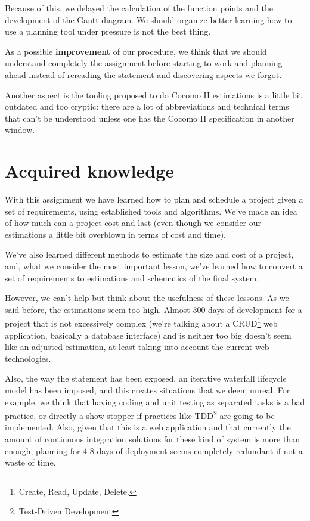 \documentclass{article}
\begin{document}
Because of this, we delayed the calculation of the function points and the development of the Gantt diagram. We should organize better learning how to use a planning tool under pressure is not the best thing.

As a possible \textbf{improvement} of our procedure, we think that we should understand completely the assignment before starting to work and planning ahead instead of rereading the statement and discovering aspects we forgot.

Another aspect is the tooling proposed to do Cocomo II estimations is a little bit outdated and too cryptic: there are a lot of abbreviations and technical terms that can't be understood unless one has the Cocomo II specification in another window.

\section{Acquired knowledge}

With this assignment we have learned how to plan and schedule a project given a set of requirements, using established tools and algorithms. We've made an idea of how much can a project cost and last (even though we consider our estimations a little bit overblown in terms of cost and time).

We've also learned different methods to estimate the size and cost of a project, and, what we consider the most important lesson, we've learned how to convert a set of requirements to estimations and schematics of the final system.

However, we can't help but think about the usefulness of these lessons. As we said before, the estimations seem too high. Almost 300 days of development for a project that is not excessively complex (we're talking about a CRUD\footnote{Create, Read, Update, Delete.} web application, basically a database interface) and is neither too big doesn't seem like an adjusted estimation, at least taking into account the current web technologies.

Also, the way the statement has been exposed, an iterative waterfall lifecycle model has been imposed, and this creates situations that we deem unreal. For example, we think that having coding and unit testing as separated tasks is a bad practice, or directly a show-stopper if practices like TDD\footnote{Test-Driven Development} are going to be implemented. Also, given that this is a web application and that currently the amount of continuous integration solutions for these kind of system is more than enough, planning for 4-8 days of deployment seems completely redundant if not a waste of time.
\end{document}

